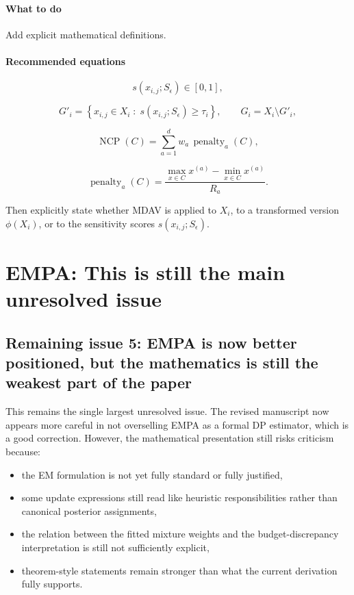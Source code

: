 \documentclass[11pt]{article}
\begin{document}
\paragraph{What to do}
Add explicit mathematical definitions.

\paragraph{Recommended equations}
\begin{equation}
s(x_{i,j};S_\epsilon) \in [0,1],
\label{eq:sensitivity-score-remaining}
\end{equation}

\begin{equation}
G'_i
=
\left\{
x_{i,j} \in X_i \;:\; s(x_{i,j};S_\epsilon)\ge \tau_i
\right\},
\qquad
G_i = X_i \setminus G'_i,
\label{eq:sensitive-partition-remaining}
\end{equation}

\begin{equation}
\operatorname{NCP}(C)
=
\sum_{a=1}^{d}
w_a \, \operatorname{penalty}_a(C),
\label{eq:ncp-remaining}
\end{equation}

\begin{equation}
\operatorname{penalty}_a(C)
=
\frac{
\max_{x \in C} x^{(a)} - \min_{x \in C} x^{(a)}
}{
R_a
}.
\label{eq:ncp-penalty-remaining}
\end{equation}

Then explicitly state whether MDAV is applied to \(X_i\), to a transformed version \(\phi(X_i)\), or to the sensitivity scores \(s(x_{i,j};S_\epsilon)\).

\section{EMPA: This is still the main unresolved issue}

\subsection*{Remaining issue 5: EMPA is now better positioned, but the mathematics is still the weakest part of the paper}
This remains the single largest unresolved issue. The revised manuscript now appears more careful in not overselling EMPA as a formal DP estimator, which is a good correction. However, the mathematical presentation still risks criticism because:
\begin{itemize}
    \item the EM formulation is not yet fully standard or fully justified,
    \item some update expressions still read like heuristic responsibilities rather than canonical posterior assignments,
    \item the relation between the fitted mixture weights and the budget-discrepancy interpretation is still not sufficiently explicit,
    \item theorem-style statements remain stronger than what the current derivation fully supports.
\end{itemize}
\end{document}
